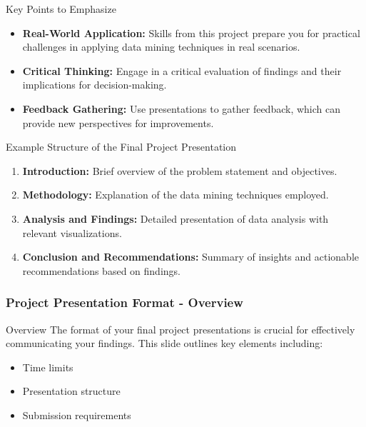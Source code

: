 \documentclass[aspectratio=169]{beamer}
\begin{document}
\begin{frame}[fragile]{Key Points to Emphasize}
  \begin{itemize}
    \item \textbf{Real-World Application:} Skills from this project prepare you for practical challenges in applying data mining techniques in real scenarios.
    
    \item \textbf{Critical Thinking:} Engage in a critical evaluation of findings and their implications for decision-making.
    
    \item \textbf{Feedback Gathering:} Use presentations to gather feedback, which can provide new perspectives for improvements.
  \end{itemize}
\end{frame}

\begin{frame}[fragile]{Example Structure of the Final Project Presentation}
  \begin{enumerate}
    \item \textbf{Introduction:} Brief overview of the problem statement and objectives.
    \item \textbf{Methodology:} Explanation of the data mining techniques employed.
    \item \textbf{Analysis and Findings:} Detailed presentation of data analysis with relevant visualizations.
    \item \textbf{Conclusion and Recommendations:} Summary of insights and actionable recommendations based on findings.
  \end{enumerate}
\end{frame}

\begin{frame}[fragile]
    \frametitle{Project Presentation Format - Overview}
    \begin{block}{Overview}
        The format of your final project presentations is crucial for effectively communicating your findings. This slide outlines key elements including:
        \begin{itemize}
            \item Time limits
            \item Presentation structure
            \item Submission requirements
        \end{itemize}
    \end{block}
\end{frame}
\end{document}
